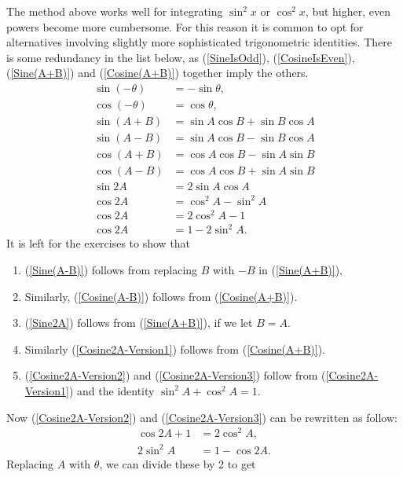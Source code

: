 The method above works well for integrating
$\sin^2x$ or $\cos^2x$, but higher, even powers
become more cumbersome.  For this reason it is 
common to opt for alternatives involving 
slightly more sophisticated trigonometric identities.
There is some redundancy in the list below, as 
(\ref{SineIsOdd}), (\ref{CosineIsEven}),
(\ref{Sine(A+B)}) and (\ref{Cosine(A+B)}) together imply 
the others.
\begin{align}
\sin(-\theta)&=-\sin\theta,\label{SineIsOdd}\\
\cos(-\theta)&=\cos\theta,\label{CosineIsEven}\\
\sin(A+B)&=\sin A\cos B+\sin B\cos A\label{Sine(A+B)}\\
\sin(A-B)&=\sin A\cos B-\sin B\cos A\label{Sine(A-B)}\\
\cos(A+B)&=\cos A\cos B-\sin A\sin B\label{Cosine(A+B)}\\
\cos(A-B)&=\cos A\cos B+\sin A\sin B\label{Cosine(A-B)}\\
\sin 2A&=2\sin A\cos A\label{Sine2A}\\
\cos 2A&=\cos^2A-\sin^2A\label{Cosine2A-Version1}\\
\cos 2A&=2\cos^2A-1\label{Cosine2A-Version2}\\
\cos 2A&=1-2\sin^2A.\label{Cosine2A-Version3}
\end{align}
It is left for the exercises to show that 
\begin{enumerate}
\item (\ref{Sine(A-B)})
follows from replacing $B$ with $-B$ in (\ref{Sine(A+B)}),
\item Similarly, (\ref{Cosine(A-B)})
follows from (\ref{Cosine(A+B)}).
\item (\ref{Sine2A}) follows from (\ref{Sine(A+B)}), if we let $B=A$.
\item Similarly (\ref{Cosine2A-Version1}) follows from (\ref{Cosine(A+B)}).
\item (\ref{Cosine2A-Version2}) and (\ref{Cosine2A-Version3})
      follow from (\ref{Cosine2A-Version1}) and the identity
      $\sin^2A+\cos^2A=1$.
\end{enumerate}
Now (\ref{Cosine2A-Version2}) and (\ref{Cosine2A-Version3}) can 
be rewritten as follow:
\begin{align*}
\cos2A+1&=2\cos^2A,\\
2\sin^2A&=1-\cos2A.\end{align*}
Replacing $A$ with $\theta$, we can divide these by 2 to get
